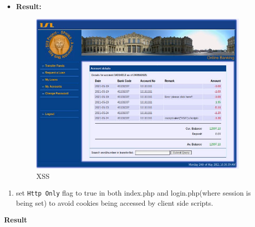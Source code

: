 \begin{itemize}
\begin{Shaded}
\begin{Highlighting}[]
 \OperatorTok{=} \NormalTok{(}\NormalTok{)}\OtherTok{;}
\end{Highlighting}
\end{Shaded}
\item
  \textbf{Result:}

  \begin{figure}
  \centering
  \includegraphics{images/task2/4_XSS.JPG}
  \caption{XSS}
  \end{figure}
\end{itemize}

\begin{enumerate}
\def\labelenumi{\arabic{enumi}.}
\setcounter{enumi}{1}
\tightlist
\item
  set \texttt{Http\ Only} flag to true in both index.php and
  login.php(where session is being set) to avoid cookies being accessed
  by client side scripts.
\end{enumerate}

\begin{Shaded}
\begin{Highlighting}[]
\NormalTok{(}\NormalTok{[}\NormalTok{]}\OtherTok{,}\OtherTok{,}\OtherTok{,}\OtherTok{,}\NormalTok{)}\OtherTok{;}
\end{Highlighting}
\end{Shaded}

\textbf{Result}

